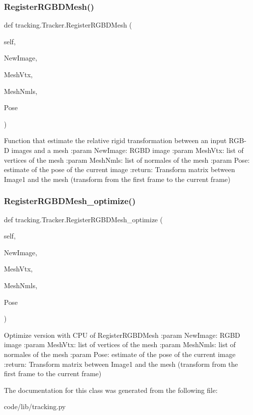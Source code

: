 \subsubsection{\texorpdfstring{Register\+R\+G\+B\+D\+Mesh()}{RegisterRGBDMesh()}}
{\footnotesize\ttfamily def tracking.\+Tracker.\+Register\+R\+G\+B\+D\+Mesh (\begin{DoxyParamCaption}\item[{}]{self,  }\item[{}]{New\+Image,  }\item[{}]{Mesh\+Vtx,  }\item[{}]{Mesh\+Nmls,  }\item[{}]{Pose }\end{DoxyParamCaption})}

\begin{DoxyVerb}Function that estimate the relative rigid transformation between an input RGB-D images and a mesh
:param NewImage: RGBD image
:param MeshVtx: list of vertices of the mesh
:param MeshNmls: list of normales of the mesh
:param Pose:  estimate of the pose of the current image
:return: Transform matrix between Image1 and the mesh (transform from the first frame to the current frame)
\end{DoxyVerb}
 \mbox{\label{classtracking_1_1_tracker_a435754ca561996d43da1bd5d91b9ad36}} 
\subsubsection{\texorpdfstring{Register\+R\+G\+B\+D\+Mesh\+\_\+optimize()}{RegisterRGBDMesh\_optimize()}}
{\footnotesize\ttfamily def tracking.\+Tracker.\+Register\+R\+G\+B\+D\+Mesh\+\_\+optimize (\begin{DoxyParamCaption}\item[{}]{self,  }\item[{}]{New\+Image,  }\item[{}]{Mesh\+Vtx,  }\item[{}]{Mesh\+Nmls,  }\item[{}]{Pose }\end{DoxyParamCaption})}

\begin{DoxyVerb}Optimize version with CPU  of RegisterRGBDMesh
:param NewImage: RGBD image
:param MeshVtx: list of vertices of the mesh
:param MeshNmls: list of normales of the mesh
:param Pose:  estimate of the pose of the current image
:return: Transform matrix between Image1 and the mesh (transform from the first frame to the current frame)
\end{DoxyVerb}
 

The documentation for this class was generated from the following file\+:\begin{DoxyCompactItemize}
\item 
code/lib/tracking.\+py\end{DoxyCompactItemize}
